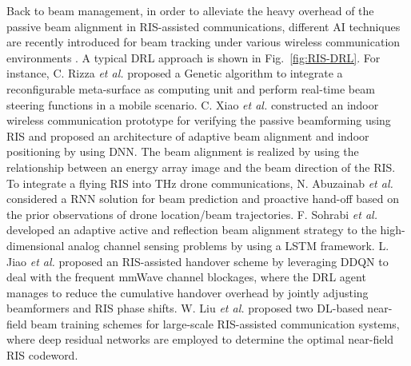 \documentclass[journal,comsoc]{IEEEtran}
\begin{document}
Back to beam management, in order to alleviate the heavy overhead of the passive beam alignment in RIS-assisted communications, different AI techniques are recently introduced for beam tracking under various wireless communication environments \cite{Real-Time-Beam-steering,RIS-Aided-Indoor-Beam-Alignment,Deep-Learning-THz-Drones,Active-Sensing-learning-2022,Enabling-Efficient-Blockage-Aware-Handover,Low-overhead-Beam-Training-Large-Scale-RIS-2022}. A typical DRL approach is shown in Fig.~\ref{fig:RIS-DRL}. For instance, C. Rizza \emph{et al.} \cite{Real-Time-Beam-steering} proposed a Genetic algorithm to integrate a reconfigurable meta-surface as computing unit and perform real-time beam steering functions in a mobile scenario. C. Xiao \emph{et al.} \cite{RIS-Aided-Indoor-Beam-Alignment} constructed an indoor wireless communication prototype for verifying the passive beamforming using RIS and proposed an architecture of adaptive beam alignment and indoor positioning by using DNN. The beam alignment is realized by using the relationship between an energy array image and the beam direction of the RIS. To integrate a flying RIS into THz drone communications, N. Abuzainab  \emph{et al.} \cite{Deep-Learning-THz-Drones} considered a RNN solution for beam prediction and proactive hand-off based on the prior observations of drone location/beam trajectories. F. Sohrabi \emph{et al.} \cite{Active-Sensing-learning-2022} developed an adaptive active and reflection beam alignment strategy to the high-dimensional analog channel sensing problems by using a LSTM framework. L. Jiao \emph{et al.} \cite{Enabling-Efficient-Blockage-Aware-Handover} proposed an RIS-assisted handover scheme by leveraging DDQN to deal with the frequent mmWave channel blockages, where the DRL agent manages to reduce the cumulative handover overhead by jointly adjusting beamformers and RIS phase shifts. W. Liu \emph{et al.} \cite{Low-overhead-Beam-Training-Large-Scale-RIS-2022} proposed two DL-based near-field beam training schemes for large-scale RIS-assisted communication systems, where deep residual networks are employed to determine the optimal near-field RIS codeword.
\end{document}
